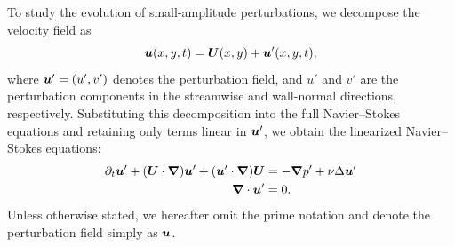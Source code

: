 \documentclass[../main.tex]{subfiles}
\begin{document}
To study the evolution of small-amplitude perturbations, we decompose the velocity field as
\begin{equation}
    \bm{u}(x, y, t) = \bm{U}(x, y) + \bm{u}'(x, y, t),
\end{equation}
where $\bm{u}'=(u',v')$ denotes the perturbation field, and $u'$ and $v'$ are the perturbation components in the streamwise and wall-normal directions, respectively. Substituting this decomposition into the full Navier--Stokes equations and retaining only terms linear in $\bm{u}'$, we obtain the linearized Navier--Stokes equations:
\begin{equation}
	\begin{aligned}
		\partial_t \bm{u}' + (\bm{U} \cdot \grad) \bm{u}' + (\bm{u}' \cdot \grad) \bm{U} & = -\grad p' + \nu \Delta \bm{u}' \\
		\grad \cdot \bm{u}'                                                              & = 0.
	\end{aligned}
	\label{eq:linearizedns}
\end{equation}
Unless otherwise stated, we hereafter omit the prime notation and denote the perturbation field simply as $\bm{u}$. 

\end{document}
